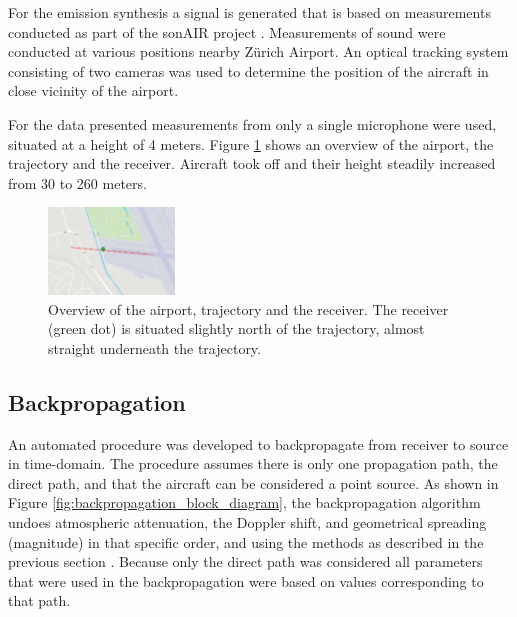 For the emission synthesis a signal is generated that is based on measurements
conducted as part of the sonAIR project \cite{Zellmann2013}. Measurements of
sound were conducted at various positions nearby Z\"{u}rich Airport. An
optical tracking system consisting of two cameras was used to determine the
position of the aircraft in close vicinity of the airport.

For the data presented measurements from only a single microphone
were used, situated at a height of 4 meters. Figure \ref{fig:figure_trajectory}
shows an overview of the airport, the trajectory and the receiver.
Aircraft took off and their height steadily increased from 30 to 260 meters.


\begin{figure}[H]
  \centering
  \includegraphics[width=0.3\textwidth]{../figures/manual/auralisation-paper/figure_trajectory}
  \caption{Overview of the airport, trajectory and the receiver. The receiver
(green dot) is situated slightly north of the trajectory, almost straight underneath the
trajectory.}
  \label{fig:figure_trajectory}
\end{figure}


\subsection{Backpropagation}
An automated procedure was developed to backpropagate from receiver to source in
time-domain. The procedure assumes there is only one propagation path,
the direct path, and that the aircraft can be considered a point source.
As shown in Figure \ref{fig:backpropagation_block_diagram}, the
backpropagation algorithm undoes atmospheric attenuation, the Doppler shift, and
geometrical spreading (magnitude) in that specific order, and using the methods as
described in the previous section \cite{Rietdijk2015}.
Because only the direct path was considered all parameters that were used in the
backpropagation were based on values corresponding to that path.

